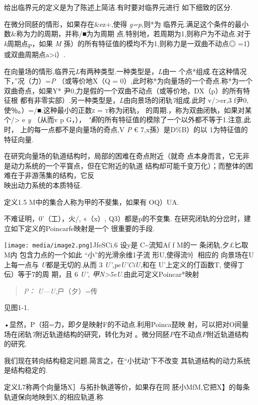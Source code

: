 \documentclass{article}
\begin{document}
给出临界元的定义是为了陈述上简洁.有时要对临界元进行 如下细致的区分.

在微分同胚的情形，如果存在\&ez+,使得 \emph{g=p,}则*为
临界元.满足这个条件的最小数\&称为力的周期，并称/■为为周期
点.特别地，若周期为1,则称户为不动点.对于\emph{k}周期点\textsubscript{P}，如果
\emph{M} 孫）的所有特征值的模均不为1,则称力是一双曲不动点◎
=1）或双曲周期点a\textgreater{}i）.

在向量场的情形,临界元\emph{L}有两种类型.一种类型是，\emph{L}由一
个点*组成.在这种情况下，''况（力）=\emph{P} （或等价地X（Q =
0）,此时称*为向量场的一个奇点.称*为一个双曲奇点，如果Y*
尹0,力是假的一个双曲不动点（或等价地，DX（p）的所有特征根
都有非零实部）.另一种类型是，\emph{L}由向景场的闭轨\emph{7}组成.此时
v/\textgreater{}er,3 f尹0,使％。）=/■.这种最小的正数\textsc{z =
t}称为闭轨， 的周期.，称为双曲闭執，如果对某个/\textgreater{} e \emph{y}
（从而v p G，），
\emph{"蓟}的所有特征值的模除了一个以外都不等于1.注意,此时，
上的每一点都不是向量场的奇点,V \emph{P} € 7,x孫）是D\%B）的以
1为特征值的特征向量.

在研究向量场的轨道结构时，局部的困难在奇点附近（就奇
点本身而言，它无非是动力系统的一个平寳点，但在它附近的轨道
结构却可能千变万化）；而整体的困难在于非游荡集的结构，它反\\
映出动力系统的本质特征.

定义1.5 M中的集合人称为甲的不斐集，如果有 OQ）UA.

不难证明，0'（工），火/, «（x）, Q3）都是p的不变集.
在研究闭轨的分岔时，建立如下定义的Poincarfe映射是一个 很重要的手段.

\texttt{[image: media/image2.png]}JfeSCi.6
设y是 C\textasciitilde{}流知Af f M的一 条闭轨,夕£匕取M内
包含力点的一个如此 ``小''的光滑余维1子流 形U,使得流9｝相应的
向景场在U上每一点与 \emph{U}都是无切的.从而 3 \emph{U',peU'CiU,}和在
U'上定义的仃函数T, 使得丁伝）等于7的周 期，且 6 \emph{U',
甲N\textgreater{}5eU.}由此可定义Poincar*映射

\begin{quote}
\emph{P： U---U,}户（夕）=传
\end{quote}

见图1-1.

•显然，P（招=力，即夕是映射F的不动点.利用Poinca琵映
射，可以把对O间量场在闭轨\emph{7}附近轨道结构的研究，转化为对
。微分同胚\emph{P}在不动点\emph{P}附近轨道结构的研究.

我们现在转向结构稳定问题.简言之，在``小扰动"下不改变
其轨道结构的动力系统是结构稳定的.

定义L7称两个向量场X］与拓扑執道等价，如果存在同
胚小MfM,它把X】的每条轨道保向地映到X,的相应轨道.称
\end{document}
